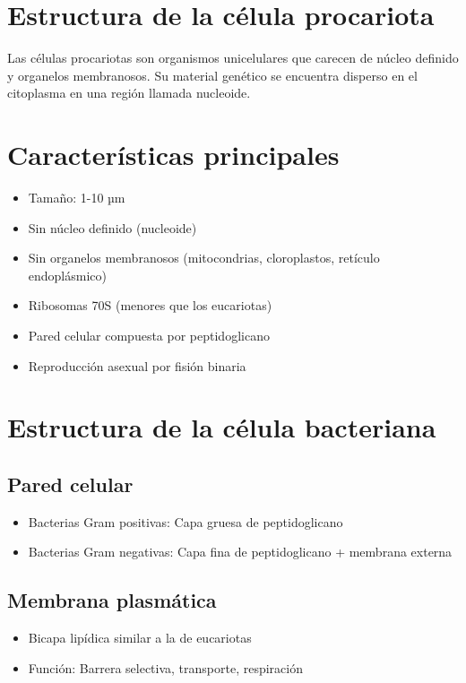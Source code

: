 \section{Estructura de la célula procariota}

Las células procariotas son organismos unicelulares que carecen de núcleo definido y organelos membranosos. Su material genético se encuentra disperso en el citoplasma en una región llamada nucleoide.

\section{Características principales}

\begin{itemize}
    \item Tamaño: 1-10 µm
    \item Sin núcleo definido (nucleoide)
    \item Sin organelos membranosos (mitocondrias, cloroplastos, retículo endoplásmico)
    \item Ribosomas 70S (menores que los eucariotas)
    \item Pared celular compuesta por peptidoglicano
    \item Reproducción asexual por fisión binaria
\end{itemize}

\section{Estructura de la célula bacteriana}

\subsection{Pared celular}
\begin{itemize}
    \item Bacterias Gram positivas: Capa gruesa de peptidoglicano
    \item Bacterias Gram negativas: Capa fina de peptidoglicano + membrana externa
\end{itemize}

\subsection{Membrana plasmática}
\begin{itemize}
    \item Bicapa lipídica similar a la de eucariotas
    \item Función: Barrera selectiva, transporte, respiración
\end{itemize}

